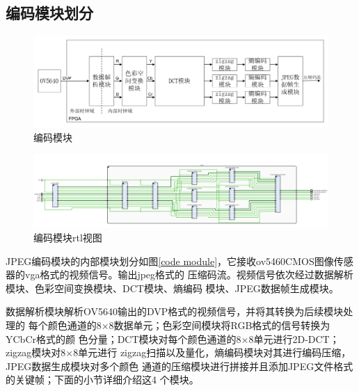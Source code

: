 \documentclass{article}
\numberwithin {equation}{section}
\begin{document}
\begin{spacing}{1.25}
  \subsection{编码模块划分}
    \vspace{1em}
    \begin{figure}[H]
      \centering
      \includegraphics[scale=0.3]{./pictures/CoderTop.png}
      \caption{编码模块}
      \label{code module}
    \end{figure}
    \begin{figure}[H]
      \centering
      \includegraphics[scale=0.3]{./pictures/TOPrtl.png}
      \caption{编码模块rtl视图}
      \label{code module rtl}
    \end{figure}
    JPEG编码模块的内部模块划分如图\ref{code 
    module}，它接收ov5460CMOS图像传感器的vga格式的视频信号。输出jpeg格式的
    压缩码流。视频信号依次经过数据解析模块、色彩空间变换模块、DCT模块、熵编码
    模块、JPEG数据帧生成模块。

    数据解析模块解析OV5640输出的DVP格式的视频信号，并将其转换为后续模块处理的
    每个颜色通道的8×8数据单元；色彩空间模块将RGB格式的信号转换为YCbCr格式的颜
    色分量；DCT模块对每个颜色通道的8×8单元进行2D-DCT；zigzag模块对8×8单元进行
    zigzag扫描以及量化，熵编码模块对其进行编码压缩，JPEG数据生成模块对多个颜色
    通道的压缩模块进行拼接并且添加JPEG文件格式的关键帧；下面的小节详细介绍这4
    个模块。

\end{spacing}
\end{document}
